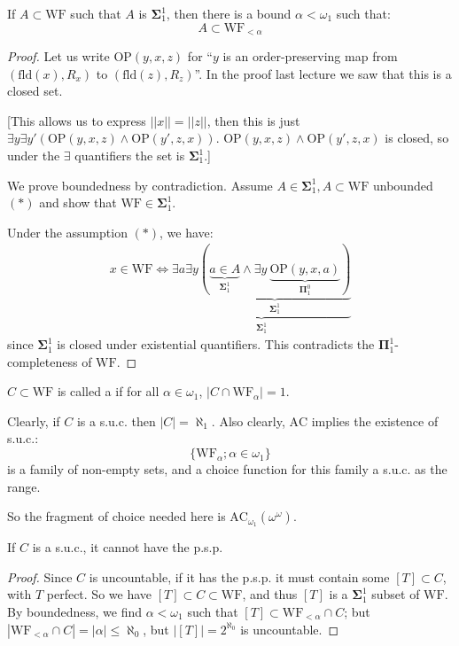 \documentclass[]{article}
\newcommand{\om}{\omega}
\renewcommand{\ac}{\textrm{AC}}
\newcommand{\bosig}{\bm{\Sigma}}
\newcommand{\bopi}{\bm{\Pi}}
\newcommand{\fld}{\textrm{fld}}
\newcommand{\wf}{\textrm{WF}}
\newcommand{\op}{\textrm{OP}}
\begin{document}
\begin{theorem*}
    If $A\subset \wf$ such that $A$ is $\bosig^1_1$, then there is a bound $\alpha < \om_1$ such that: $$A\subset \wf_{<\alpha}$$
\end{theorem*}
\begin{proof}
    Let us write $\op(y,x,z)$ for ``$y$ is an order-preserving map from $(\fld(x),R_x)$ to $(\fld(z),R_z)$''. In the proof last lecture we saw that this is a closed set.

    [This allows us to express $||x|| = ||z||$, then this is just $\exists y \exists y' (\op(y,x,z)\land\op(y',z,x))$. $\op(y,x,z)\land \op(y',z,x)$ is closed, so under the $\exists$ quantifiers the set is $\bosig^1_1$.]

    We prove boundedness by contradiction. Assume $A \in \bosig^1_1, A\subset \wf$ unbounded $(\ast)$ and show that $\wf \in \bosig^1_1$.

    Under the assumption $(\ast)$, we have: 
    \begin{align*}{}
        x \in \wf \iff \underbrace{\exists a \exists y\underbrace{(\underbrace{a\in A}_{\bosig^1_1} \land \exists y\ \underbrace{\op(y,x,a)}_{\bopi^0_1})}_{\bosig^1_1}}_{\bosig^1_1}
    \end{align*}
    since $\bosig^1_1$ is closed under existential quantifiers. This contradicts the $\bopi^1_1$-completeness of $\wf$.
\end{proof}

\begin{defin*}
    $C\subset \wf$ is called a  if for all $\alpha \in \om_1$, $|C\cap \wf_\alpha| = 1$.
\end{defin*}

Clearly, if $C$ is a s.u.c. then $|C| = \aleph_1$. Also clearly, $\ac$ implies the existence of s.u.c.: $$\{\wf_{\alpha};\alpha \in \om_1\}$$ is a family of non-empty sets, and a choice function for this family a s.u.c. as the range.

So the fragment of choice needed here is $\ac_{\om_1}(\om^\om)$.

\begin{theorem*}
    If $C$ is a s.u.c., it cannot have the p.s.p.
\end{theorem*}
\begin{proof}
    Since $C$ is uncountable, if it has the p.s.p. it must contain some $[T]\subset C$, with $T$ perfect. So we have $[T]\subset C\subset \wf$, and thus $[T]$ is a $\bosig^1_1$ subset of $\wf$. By boundedness, we find $\alpha < \om_1$ such that $[T]\subset \wf_{<\alpha}\cap C$; but $|\wf_{<\alpha}\cap C| = |\alpha| \le \aleph_0$, but $|[T]| = 2^{\aleph_0}$ is uncountable.
\end{proof}
\end{document}
